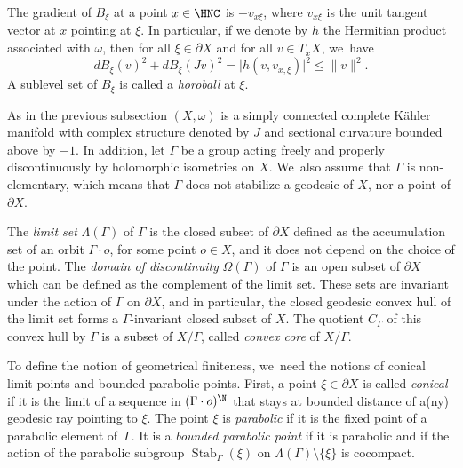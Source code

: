 The gradient of $B_{\xi}$ at a point $x\in \HNC$ is $-v_{x\xi}$, where $v_{x\xi}$ is the unit tangent vector at $x$ pointing at $\xi$. In particular, if we denote by $h$ the Hermitian product associated with $\omega$, then for all $\xi\in \partial X$ and for all $v\in T_xX$, we~have\begin{equation}\label{ineq-dBJ}
dB_{\xi}(v)^{2} + dB_{\xi}(Jv)^{2} = \lvert h(v,v_{x,\xi})\rvert^{2}\le \lVert v\rVert^{2}.
\end{equation}
A sublevel set of $B_{\xi}$ is called a \textit{horoball} at $\xi$.

\label{sec:gen-geom-finite}

As in the previous subsection $(X,\omega)$ is a simply connected complete Kähler manifold with complex structure denoted by $J$ and sectional curvature bounded above by $-1$. In addition, let $\Gamma$ be a group acting freely and properly discontinuously by holomorphic isometries on $X$. We~also assume that $\Gamma$ is non-elementary, which means that $\Gamma$ does not stabilize a geodesic of $X$, nor a point of $\partial X$.\par

The \textit{limit set} $\Lambda(\Gamma)$ of $\Gamma$ is the closed subset of $\partial X$ defined as the accumulation set of an orbit $\Gamma \cdot o$, for some point $o\in X$, and it does not depend on the choice of the point. The \textit{domain of discontinuity} $\Omega(\Gamma)$ of $\Gamma$ is an open subset of $\partial X$ which can be defined as the complement of the limit set. These sets are invariant under the action of $\Gamma$ on $\partial X$, and in particular, the closed geodesic convex hull of the limit set forms a $\Gamma$\nobreakdash-invariant closed subset of $X$. The quotient $C_{\Gamma}$ of this convex hull by $\Gamma$ is a subset of $X/\Gamma$, called \textit{convex core} of $X/\Gamma$.

To define the notion of geometrical finiteness, we~need the notions of conical limit points and bounded parabolic points. First, a point $\xi\in \partial X$ is called \textit{conical} if it is the limit of a sequence in $(\Gamma \cdot o)^{\N}$ that stays at bounded distance of a(ny) geodesic ray pointing to $\xi$. The point $\xi$ is \textit{parabolic} if it is the fixed point of a parabolic element of~$\Gamma$. It is a \textit{bounded parabolic point} if it is parabolic and if the action of the parabolic subgroup $\operatorname{Stab}_{\Gamma}(\xi)$ on $\Lambda(\Gamma)\setminus\{\xi\}$ is cocompact.

